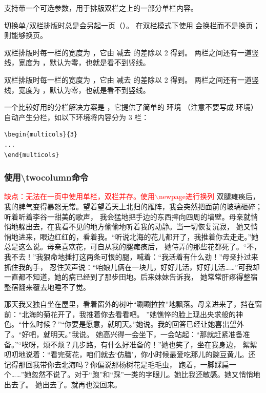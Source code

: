 \documentclass[fontset=windows, 12pt]{article}
\newcommand{\red}[1]{\textcolor{red}{#1}}
\begin{document}
 支持带一个可选参数，用于排版双栏之上的一部分单栏内容。

切换单/双栏排版时总是会另起一页（）。
在双栏模式下使用  会换栏而不是换页； 则能够换页。

双栏排版时每一栏的宽度为 ，它由  减去  的差除以 2 得到。
两栏之间还有一道竖线，宽度为 ，默认为零，也就是看不到竖线。

双栏排版时每一栏的宽度为 ，它由  减去  的差除以 2 得到。
两栏之间还有一道竖线，宽度为 ，默认为零，也就是看不到竖线。

一个比较好用的分栏解决方案是 ，它提供了简单的  环境
（注意不要写成  环境）自动产生分栏，如以下环境将内容分为 3 栏：
\begin{verbatim}
\begin{multicols}{3}
...
\end{multicols}
\end{verbatim}


\subsubsection{使用\textbackslash twocolumn命令}
\red{缺点：无法在一页中使用单栏，双栏并存。使用$\backslash$newpage进行换列}
\twocolumn
\columnseprule=0.5pt
双腿瘫痪后，我的脾气变得暴怒无常。望着望着天上北归的雁阵，我会突然把面前的玻璃砸碎；听着听着李谷一甜美的歌声，
我会猛地把手边的东西摔向四周的墙壁。母亲就悄悄地躲出去，在我看不见的地方偷偷地听着我的动静。当一切恢复沉寂，
她又悄悄地进来，眼边红红的，看着我。“听说北海的花儿都开了，我推着你去走走。”她总是这么说。母亲喜欢花，可自从我的腿瘫痪后，
她侍弄的那些花都死了。“不，我不去！”我狠命地捶打这两条可恨的腿，喊着：“我活着有什么劲！”母亲扑过来抓住我的手，
忍住哭声说：“咱娘儿俩在一块儿，好好儿活，好好儿活……”可我却一直都不知道，她的病已经到了那步田地。后来妹妹告诉我，
她常常肝疼得整宿整宿翻来覆去地睡不了觉。

那天我又独自坐在屋里，看着窗外的树叶“唰唰拉拉”地飘落。母亲进来了，挡在窗前：“北海的菊花开了，我推着你去看看吧。
”她憔悴的脸上现出央求般的神色。“什么时候？”“你要是愿意，就明天。”她说。我的回答已经让她喜出望外了。“好吧，就明天。”我说。
她高兴得一会坐下，一会站起：“那就赶紧准备准备。”“唉呀，烦不烦？几步路，有什么好准备的！”她也笑了，坐在我身边，
絮絮叨叨地说着：“看完菊花，咱们就去‘仿膳’，你小时候最爱吃那儿的豌豆黄儿。还记得那回我带你去北海吗？你偏说那杨树花是毛毛虫，
跑着，一脚踩扁一个……”她忽然不说了。对于“跑”和“踩”一类的字眼儿。她比我还敏感。她又悄悄地出去了。
\newpage 
她出去了。就再也没回来。
\end{document}
